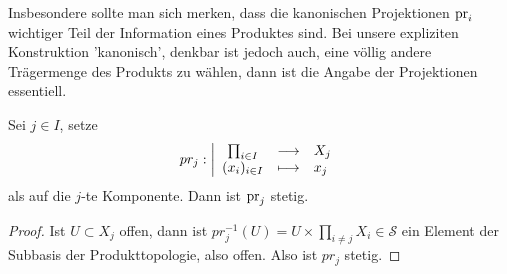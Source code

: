 \begin{remark*}
    Insbesondere sollte man sich merken, dass die kanonischen Projektionen $\operatorname{pr}_i$ wichtiger Teil der Information eines Produktes sind. Bei unsere expliziten Konstruktion 'kanonisch', denkbar ist jedoch auch, eine völlig andere Trägermenge des Produkts zu wählen, dann ist die Angabe der Projektionen essentiell.
\end{remark*}
\begin{dlemmadef}
    Sei $j\in I$, setze
        \begin{equation*}
        pr_j: \left| \begin{array}{c c l} 
        \prod_{i\in I}  & \longrightarrow & X_j \\
        (x_i)_{i \in I} & \longmapsto &  x_j
        \end{array} \right.
    \end{equation*}
    als  auf die $j$-te Komponente. Dann ist $\operatorname{pr}_j$ stetig.
\end{dlemmadef}

    \begin{proof}
        Ist $U\subset X_j$ offen, dann ist $pr_j^{-1}(U) = U\times \prod_{i\neq j} X_i\in \mathcal{S}$ ein Element der Subbasis der Produkttopologie, also offen. Also ist $pr_j$ stetig.
    \end{proof}

